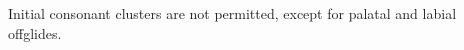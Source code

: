 \documentclass[grammar]{subfiles}
\begin{document}
  Initial consonant clusters are not permitted, except for palatal and labial offglides.

%
%
%
\end{document}
